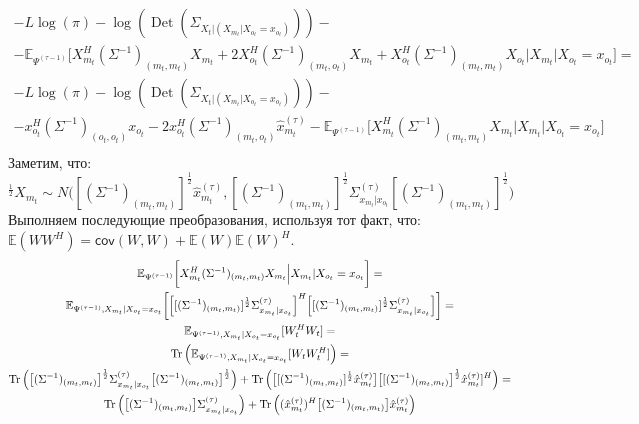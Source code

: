 \documentclass[11pt]{article}
\newcommand{\Expect}{\mathbb{E}}
\newcommand{\Cov}{\mathsf{cov}}
\DeclareMathOperator{\Det}{Det}
\begin{document}
\begin{equation*}
\begin{gathered}
-L \log(\pi) - \log (\Det(\Sigma_{X_t|(X_{m_t}|X_{o_t}=x_{o_t})}))  - \\ 
- \Expect_{\Psi^{(\tau-1)}}\bigg[X_{m_t}^H (\Sigma^{-1})_{(m_t, m_t)}X_{m_t} + 2 X_{o_t}^H (\Sigma^{-1})_{(m_t, o_t)}X_{m_t}  + X_{o_t}^H (\Sigma^{-1})_{(m_t, m_t)}X_{o_t}\Big|X_{m_t}|X_{o_t}=x_{o_t}\bigg] = \\
-L \log(\pi) - \log (\Det(\Sigma_{X_t|(X_{m_t}|X_{o_t}=x_{o_t})}))  - \\ 
- x_{o_t}^H (\Sigma^{-1})_{(o_t, o_t)}x_{o_t} - 2 x_{o_t}^H (\Sigma^{-1})_{(m_t, o_t)}\hat{x}_{m_t}^{(\tau)} - \Expect_{\Psi^{(\tau-1)}}\bigg[X_{m_t}^H (\Sigma^{-1})_{(m_t, m_t)}X_{m_t}   \Big|X_{m_t}|X_{o_t}=x_{o_t}\bigg] \\
\end{gathered}
\end{equation*}
Заметим, что: 
\begin{equation*}
[(\Sigma^{-1})_{(m_t, m_t)}]^{\frac{1}{2}}X_{m_t} \sim N\Big([(\Sigma^{-1})_{(m_t, m_t)}]^{\frac{1}{2}}\hat{x}_{m_t}^{(\tau)},[(\Sigma^{-1})_{(m_t, m_t)}]^{\frac{1}{2}}\Sigma^{(\tau)}_{x_{m_t}|x_{o_t}}[(\Sigma^{-1})_{(m_t, m_t)}]^{\frac{1}{2}}\Big)
\end{equation*}
Выполняем последующие преобразования, используя тот факт, что: $\Expect(WW^H)=\Cov(W,W)+\Expect(W)\Expect(W)^H$.
\begin{equation*}
\begin{gathered}
\Expect_{\Psi^{(\tau-1)}}\bigg[X_{m_t}^H (\Sigma^{-1})_{(m_t, m_t)}X_{m_t}   \Big|X_{m_t}|X_{o_t}=x_{o_t}\bigg] = \\
\Expect_{\Psi^{(\tau-1)},X_{m_t}|X_{o_t}=x_{o_t}}\bigg[\Big[[(\Sigma^{-1})_{(m_t, m_t)}]^{\frac{1}{2}}\Sigma^{(\tau)}_{x_{m_t}|x_{o_t}}\Big]^H\Big[[(\Sigma^{-1})_{(m_t, m_t)}]^{\frac{1}{2}}\Sigma^{(\tau)}_{x_{m_t}|x_{o_t}}\Big]\bigg] = \\
\Expect_{\Psi^{(\tau-1)},X_{m_t}|X_{o_t}=x_{o_t}}[W_t^HW_t] = \\
\Tr \Big( \Expect_{\Psi^{(\tau-1)},X_{m_t}|X_{o_t}=x_{o_t}}[W_tW_t^H] \Big) = \\
\Tr \Big( \big[(\Sigma^{-1})_{(m_t, m_t)}\big]^{\frac{1}{2}}\Sigma^{(\tau)}_{x_{m_t}|x_{o_t}}\big[(\Sigma^{-1})_{(m_t, m_t)}\big]^{\frac{1}{2}} \Big) +  \Tr \Big( \big[[(\Sigma^{-1})_{(m_t, m_t)}]^{\frac{1}{2}}\hat{x}_{m_t}^{(\tau)}\big]\big[[(\Sigma^{-1})_{(m_t, m_t)}\big]^{\frac{1}{2}}\hat{x}_{m_t}^{(\tau)}]^H \Big)= \\
\Tr \Big( \big[(\Sigma^{-1})_{(m_t, m_t)}\big]\Sigma^{(\tau)}_{x_{m_t}|x_{o_t}} \Big) + \Tr \Big((\hat{x}_{m_t}^{(\tau)})^H\big[(\Sigma^{-1})_{(m_t, m_t)}\big]\hat{x}_{m_t}^{(\tau)} \Big) \\
\end{gathered}
\end{equation*}
\end{document}
